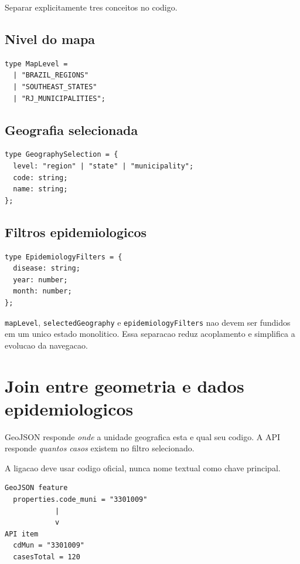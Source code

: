\documentclass[12pt,a4paper]{article}
\begin{document}
Separar explicitamente tres conceitos no codigo.

\subsection{Nivel do mapa}

\begin{lstlisting}
type MapLevel =
  | "BRAZIL_REGIONS"
  | "SOUTHEAST_STATES"
  | "RJ_MUNICIPALITIES";
\end{lstlisting}

\subsection{Geografia selecionada}

\begin{lstlisting}
type GeographySelection = {
  level: "region" | "state" | "municipality";
  code: string;
  name: string;
};
\end{lstlisting}

\subsection{Filtros epidemiologicos}

\begin{lstlisting}
type EpidemiologyFilters = {
  disease: string;
  year: number;
  month: number;
};
\end{lstlisting}

\begin{decision}
\texttt{mapLevel}, \texttt{selectedGeography} e \texttt{epidemiologyFilters} nao devem ser fundidos em um unico estado monolitico. Essa separacao reduz acoplamento e simplifica a evolucao da navegacao.
\end{decision}

\section{Join entre geometria e dados epidemiologicos}

GeoJSON responde \textit{onde} a unidade geografica esta e qual seu codigo. A API responde \textit{quantos casos} existem no filtro selecionado.

A ligacao deve usar codigo oficial, nunca nome textual como chave principal.

\begin{lstlisting}
GeoJSON feature
  properties.code_muni = "3301009"
            |
            v
API item
  cdMun = "3301009"
  casesTotal = 120
\end{lstlisting}
\end{document}
